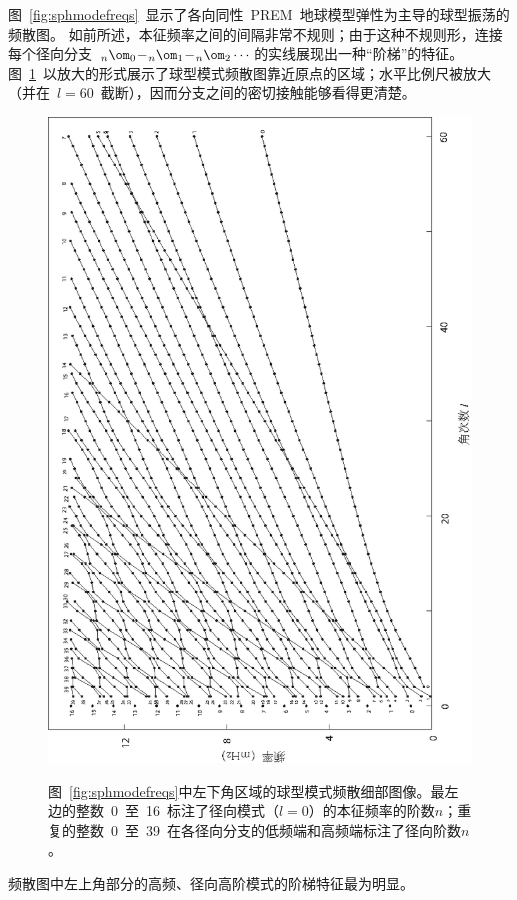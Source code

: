 图~\ref{fig:sphmodefreqs}~显示了各向同性~PREM~地球模型弹性为主导的球型振荡的频散图。
%
如前所述，本征频率之间的间隔非常不规则；由于这种不规则形，连接每个径向分支~${}_n\om_0\!-\!{}_n\om_1\!-\!{}_n\om_2\cdots$的实线展现出一种“阶梯”的特征。图~\ref{fig:sphmodefreqs2}~以放大的形式展示了球型模式频散图靠近原点的区域；水平比例尺被放大（并在~$l=60$~截断），因而分支之间的密切接触能够看得更清楚。
\begin{figure}
{
\centering
\includegraphics{../figures/chap08/fig10.eps}
}
\caption[sphmodefreqs2]{
图~\ref{fig:sphmodefreqs}中左下角区域的球型模式频散细部图像。最左边的整数~0~至~16~标注了径向模式（$l=0$）的本征频率的阶数$n$；重复的整数~0~至~39~在各径向分支的低频端和高频端标注了径向阶数$n$。
}
\label{fig:sphmodefreqs2}
\end{figure}
频散图中左上角部分的高频、径向高阶模式的阶梯特征最为明显。

